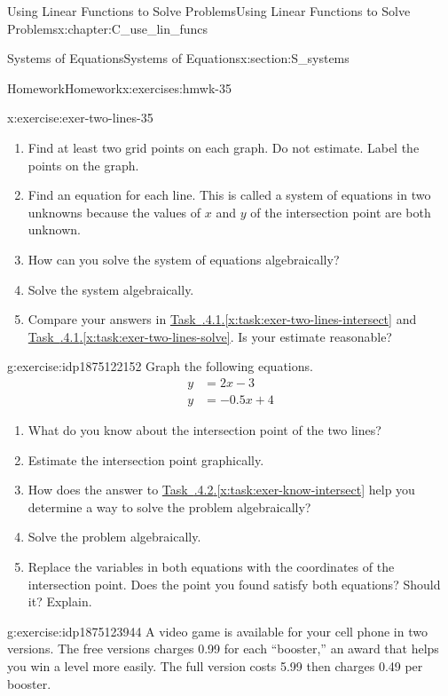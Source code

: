 \documentclass[oneside,10pt,]{book}
\newcommand{\xreffont}{\relax}
\numberwithin{equation}{chapter}
\newcommand{\amp}{&}
\begin{document}
\begin{chapterptx}{Using Linear Functions to Solve Problems}{}{Using Linear Functions to Solve Problems}{}{}{x:chapter:C_use_lin_funcs}
\begin{sectionptx}{Systems of Equations}{}{Systems of Equations}{}{}{x:section:S_systems}
\begin{exercises-subsection}{Homework}{}{Homework}{}{}{x:exercises:hmwk-35}
\begin{divisionexercise}{1}{}{}{x:exercise:exer-two-lines-35}
\begin{enumerate}[font=\bfseries,label=(\alph*),ref=\alph*]
\item{}Find at least two grid points on each graph. Do not estimate. Label the points on the graph.%
\item{}Find an equation for each line. This is called a system of equations in two unknowns because the values of \(x\) and \(y\) of the intersection point are both unknown.%
\item{}How can you solve the system of equations algebraically?%
\item\label{x:task:exer-two-lines-solve}Solve the system algebraically.%
\item{}Compare your answers in \hyperref[x:task:exer-two-lines-intersect]{Task~{\xreffont 3.5.4.1}.{\xreffont\ref{x:task:exer-two-lines-intersect}}} and \hyperref[x:task:exer-two-lines-solve]{Task~{\xreffont 3.5.4.1}.{\xreffont\ref{x:task:exer-two-lines-solve}}}. Is your estimate reasonable?%
\end{enumerate}
\end{divisionexercise}%
\begin{divisionexercise}{2}{}{}{g:exercise:idp1875122152}%
Graph the following equations.%
\begin{align*}
y \amp = 2x - 3\\
y \amp = -0.5x + 4
\end{align*}
%
\begin{enumerate}[font=\bfseries,label=(\alph*),ref=\alph*]
\item\label{x:task:exer-know-intersect}What do you know about the intersection point of the two lines?%
\item{}Estimate the intersection point graphically.%
\item{}How does the answer to \hyperref[x:task:exer-know-intersect]{Task~{\xreffont 3.5.4.2}.{\xreffont\ref{x:task:exer-know-intersect}}} help you determine a way to solve the problem algebraically?%
\item{}Solve the problem algebraically.%
\item{}Replace the variables in both equations with the coordinates of the intersection point. Does the point you found satisfy both equations? Should it? Explain.%
\end{enumerate}
\end{divisionexercise}%
\begin{divisionexercise}{3}{}{}{g:exercise:idp1875123944}%
A video game is available for your cell phone in two versions. The free versions charges \textdollar{}0.99 for each ``booster,'' an award that helps you win a level more easily. The full version costs \textdollar{}5.99 then charges \textdollar{}0.49 per booster.%

\end{divisionexercise}
\end{exercises-subsection}
\end{sectionptx}
\end{chapterptx}
\end{document}
